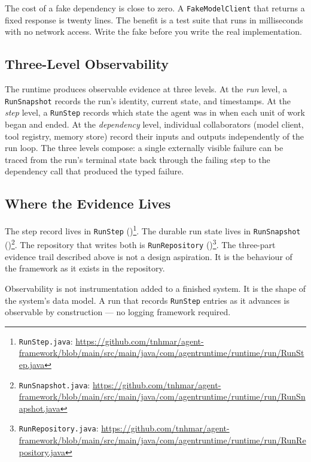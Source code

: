 \begin{tipbox}
  The cost of a fake dependency is close to zero.
  A \texttt{FakeModelClient} that returns a fixed response is twenty lines.
  The benefit is a test suite that runs in milliseconds with no network access.
  Write the fake before you write the real implementation.
\end{tipbox}

\subsection{Three-Level Observability}
\label{subsec:observability-hierarchy}

The runtime produces observable evidence at three levels.
At the \emph{run} level, a \texttt{RunSnapshot} records the run's identity, current
state, and timestamps.
At the \emph{step} level, a \texttt{RunStep} records which state the agent was in
when each unit of work began and ended.
At the \emph{dependency} level, individual collaborators (model client, tool registry,
memory store) record their inputs and outputs independently of the run loop.
The three levels compose: a single externally visible failure can be traced from the
run's terminal state back through the failing step to the dependency call that produced
the typed failure.

\subsection{Where the Evidence Lives}
\label{subsec:what-to-make-observable}

The step record lives in \texttt{RunStep} ()\footnote{\texttt{RunStep.java}:
\url{https://github.com/tnhmar/agent-framework/blob/main/src/main/java/com/agentruntime/runtime/run/RunStep.java}}.
The durable run state lives in \texttt{RunSnapshot} ()\footnote{\texttt{RunSnapshot.java}:
\url{https://github.com/tnhmar/agent-framework/blob/main/src/main/java/com/agentruntime/runtime/run/RunSnapshot.java}}.
The repository that writes both is \texttt{RunRepository} ()\footnote{\texttt{RunRepository.java}:
\url{https://github.com/tnhmar/agent-framework/blob/main/src/main/java/com/agentruntime/runtime/run/RunRepository.java}}.
The three-part evidence trail described above is not a design aspiration.
It is the behaviour of the framework as it exists in the repository.

\begin{takeawaybox}
  Observability is not instrumentation added to a finished system.
  It is the shape of the system's data model.
  A run that records \texttt{RunStep} entries as it advances is observable by
  construction — no logging framework required.
\end{takeawaybox}

